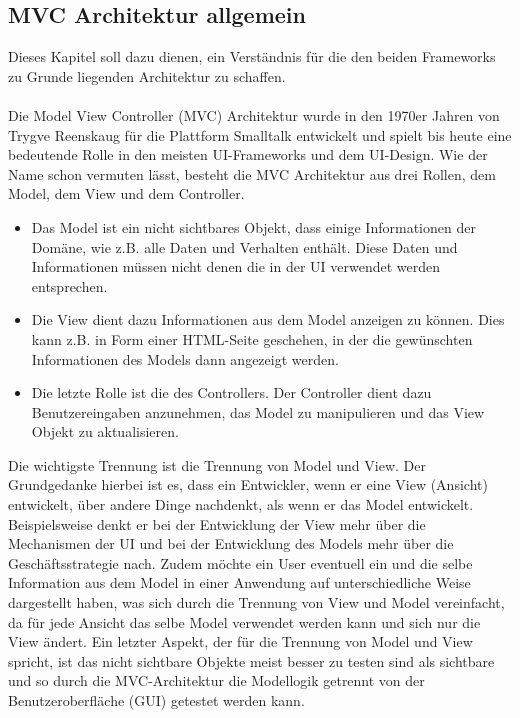\subsection{MVC Architektur allgemein}
Dieses Kapitel soll dazu dienen, ein Verständnis für die den beiden Frameworks zu Grunde liegenden Architektur zu schaffen.\\\\
Die Model View Controller (MVC) Architektur wurde in den 1970er Jahren von Trygve Reenskaug für die Plattform Smalltalk entwickelt und spielt bis heute eine bedeutende Rolle in den meisten UI-Frameworks und dem UI-Design.\citep[]{PEAA2002}
Wie der Name schon vermuten lässt, besteht die MVC Architektur aus drei Rollen, dem Model, dem View und dem Controller.
\begin{itemize}
\item Das Model ist ein nicht sichtbares Objekt, dass einige Informationen der Domäne, wie z.B. alle Daten und Verhalten enthält. Diese Daten und Informationen müssen nicht denen die in der UI verwendet werden entsprechen.

\item Die View dient dazu Informationen aus dem Model anzeigen zu können. Dies kann z.B. in Form einer HTML-Seite geschehen, in der die gewünschten Informationen des Models dann angezeigt werden.

\item Die letzte Rolle ist die des Controllers. Der Controller dient dazu Benutzereingaben anzunehmen, das Model zu manipulieren und das View Objekt zu aktualisieren.
\end{itemize}
Die wichtigste Trennung ist die Trennung von Model und View. Der Grundgedanke hierbei ist es, dass ein Entwickler, wenn er eine View (Ansicht) entwickelt, über andere Dinge nachdenkt, als wenn er das Model entwickelt. Beispielsweise denkt er bei der Entwicklung der View mehr über die Mechanismen der UI und bei der Entwicklung des Models mehr über die Geschäftsstrategie nach. Zudem möchte ein User eventuell ein und die selbe Information aus dem Model in einer Anwendung auf unterschiedliche Weise dargestellt haben, was sich durch die Trennung von View und Model vereinfacht, da für jede Ansicht das selbe Model verwendet werden kann und sich nur die View ändert. Ein letzter Aspekt, der für die Trennung von Model und View spricht, ist das nicht sichtbare Objekte meist besser zu testen sind als sichtbare und so durch die MVC-Architektur die Modellogik getrennt von der Benutzeroberfläche (GUI) getestet werden kann.
